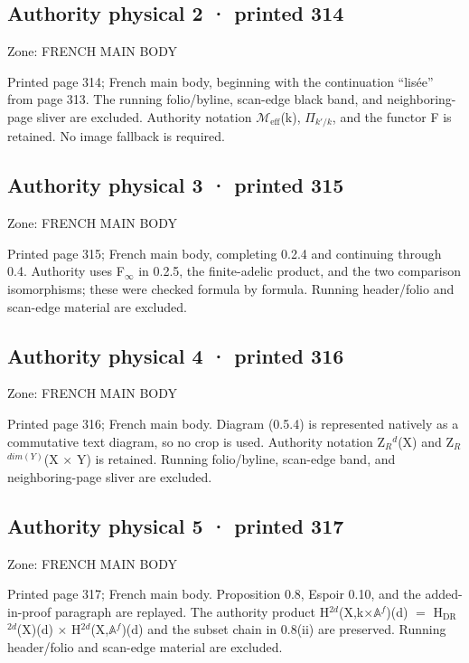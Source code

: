 \documentclass[10pt,twoside]{article}
\begin{document}
\subsection*{Authority physical 2 · printed 314}
\noindent\textsf{Zone: FRENCH MAIN BODY}\par
Printed page 314; French main body, beginning with the continuation “lisée” from page 313. The running folio/byline, scan-edge black band, and neighboring-page sliver are excluded. Authority notation \ensuremath{ℳ}\ensuremath{_{\mathrm{eff}}}(k), \ensuremath{Π}\ensuremath{_{k′/k}}, and the functor F is retained. No image fallback is required.\par
\subsection*{Authority physical 3 · printed 315}
\noindent\textsf{Zone: FRENCH MAIN BODY}\par
Printed page 315; French main body, completing 0.2.4 and continuing through 0.4. Authority uses F\ensuremath{_{∞}} in 0.2.5, the finite-adelic product, and the two comparison isomorphisms; these were checked formula by formula. Running header/folio and scan-edge material are excluded.\par
\subsection*{Authority physical 4 · printed 316}
\noindent\textsf{Zone: FRENCH MAIN BODY}\par
Printed page 316; French main body. Diagram (0.5.4) is represented natively as a commutative text diagram, so no crop is used. Authority notation Z\ensuremath{_{R}}\ensuremath{^{d}}(X) and Z\ensuremath{_{R}}\ensuremath{^{dim(Y)}}(X \ensuremath{×} Y) is retained. Running folio/byline, scan-edge band, and neighboring-page sliver are excluded.\par
\subsection*{Authority physical 5 · printed 317}
\noindent\textsf{Zone: FRENCH MAIN BODY}\par
Printed page 317; French main body. Proposition 0.8, Espoir 0.10, and the added-in-proof paragraph are replayed. The authority product H\ensuremath{^{2d}}(X,k\ensuremath{×}\ensuremath{𝔸}\ensuremath{^{f}})(d) \ensuremath{=} H\ensuremath{_{\mathrm{DR}}}\ensuremath{^{2d}}(X)(d) \ensuremath{×} H\ensuremath{^{2d}}(X,\ensuremath{𝔸}\ensuremath{^{f}})(d) and the subset chain in 0.8(ii) are preserved. Running header/folio and scan-edge material are excluded.\par
\end{document}
